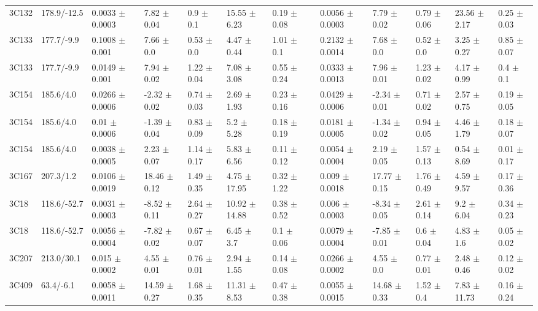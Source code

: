 \documentclass[preprint]{emulateapj}
\begin{document}
\begin{table}
\begin{tabular}{ lllllllclllll  }
3C132 & 178.9/-12.5 & 0.0033 $\pm$ 0.0003 & 7.82 $\pm$ 0.04 & 0.9 $\pm$ 0.1 & 15.55 $\pm$ 6.23 & 0.19 $\pm$ 0.08 & &  0.0056 $\pm$ 0.0003 & 7.79 $\pm$ 0.02 & 0.79 $\pm$ 0.06 & 23.56 $\pm$ 2.17 & 0.25 $\pm$ 0.03 \\
3C133 & 177.7/-9.9 & 0.1008 $\pm$ 0.001 & 7.66 $\pm$ 0.0 & 0.53 $\pm$ 0.0 & 4.47 $\pm$ 0.44 & 1.01 $\pm$ 0.1 & &  0.2132 $\pm$ 0.0014 & 7.68 $\pm$ 0.0 & 0.52 $\pm$ 0.0 & 3.25 $\pm$ 0.27 & 0.85 $\pm$ 0.07 \\
3C133 & 177.7/-9.9 & 0.0149 $\pm$ 0.001 & 7.94 $\pm$ 0.02 & 1.22 $\pm$ 0.04 & 7.08 $\pm$ 3.08 & 0.55 $\pm$ 0.24 & &  0.0333 $\pm$ 0.0013 & 7.96 $\pm$ 0.01 & 1.23 $\pm$ 0.02 & 4.17 $\pm$ 0.99 & 0.4 $\pm$ 0.1 \\
3C154 & 185.6/4.0 & 0.0266 $\pm$ 0.0006 & -2.32 $\pm$ 0.02 & 0.74 $\pm$ 0.03 & 2.69 $\pm$ 1.93 & 0.23 $\pm$ 0.16 & &  0.0429 $\pm$ 0.0006 & -2.34 $\pm$ 0.01 & 0.71 $\pm$ 0.02 & 2.57 $\pm$ 0.75 & 0.19 $\pm$ 0.05 \\
3C154 & 185.6/4.0 & 0.01 $\pm$ 0.0006 & -1.39 $\pm$ 0.04 & 0.83 $\pm$ 0.09 & 5.2 $\pm$ 5.28 & 0.18 $\pm$ 0.19 & &  0.0181 $\pm$ 0.0005 & -1.34 $\pm$ 0.02 & 0.94 $\pm$ 0.05 & 4.46 $\pm$ 1.79 & 0.18 $\pm$ 0.07 \\
3C154 & 185.6/4.0 & 0.0038 $\pm$ 0.0005 & 2.23 $\pm$ 0.07 & 1.14 $\pm$ 0.17 & 5.83 $\pm$ 6.56 & 0.11 $\pm$ 0.12 & &  0.0054 $\pm$ 0.0004 & 2.19 $\pm$ 0.05 & 1.57 $\pm$ 0.13 & 0.54 $\pm$ 8.69 & 0.01 $\pm$ 0.17 \\
3C167 & 207.3/1.2 & 0.0106 $\pm$ 0.0019 & 18.46 $\pm$ 0.12 & 1.49 $\pm$ 0.35 & 4.75 $\pm$ 17.95 & 0.32 $\pm$ 1.22 & &  0.009 $\pm$ 0.0018 & 17.77 $\pm$ 0.15 & 1.76 $\pm$ 0.49 & 4.59 $\pm$ 9.57 & 0.17 $\pm$ 0.36 \\
3C18 & 118.6/-52.7 & 0.0031 $\pm$ 0.0003 & -8.52 $\pm$ 0.11 & 2.64 $\pm$ 0.27 & 10.92 $\pm$ 14.88 & 0.38 $\pm$ 0.52 & &  0.006 $\pm$ 0.0003 & -8.34 $\pm$ 0.05 & 2.61 $\pm$ 0.14 & 9.2 $\pm$ 6.04 & 0.34 $\pm$ 0.23 \\
3C18 & 118.6/-52.7 & 0.0056 $\pm$ 0.0004 & -7.82 $\pm$ 0.02 & 0.67 $\pm$ 0.07 & 6.45 $\pm$ 3.7 & 0.1 $\pm$ 0.06 & &  0.0079 $\pm$ 0.0004 & -7.85 $\pm$ 0.01 & 0.6 $\pm$ 0.04 & 4.83 $\pm$ 1.6 & 0.05 $\pm$ 0.02 \\
3C207 & 213.0/30.1 & 0.015 $\pm$ 0.0002 & 4.55 $\pm$ 0.01 & 0.76 $\pm$ 0.01 & 2.94 $\pm$ 1.55 & 0.14 $\pm$ 0.08 & &  0.0266 $\pm$ 0.0002 & 4.55 $\pm$ 0.0 & 0.77 $\pm$ 0.01 & 2.48 $\pm$ 0.46 & 0.12 $\pm$ 0.02 \\
3C409 & 63.4/-6.1 & 0.0058 $\pm$ 0.0011 & 14.59 $\pm$ 0.27 & 1.68 $\pm$ 0.35 & 11.31 $\pm$ 8.53 & 0.47 $\pm$ 0.38 & &  0.0055 $\pm$ 0.0015 & 14.68 $\pm$ 0.33 & 1.52 $\pm$ 0.4 & 7.83 $\pm$ 11.73 & 0.16 $\pm$ 0.24 \\

\end{tabular}
\end{table}
\end{document}
